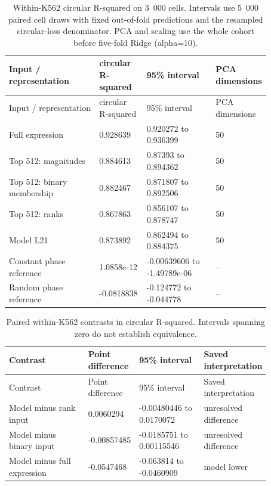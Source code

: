 \begin{longtable}{@{}L{0.34\linewidth}L{0.15\linewidth}L{0.26\linewidth}L{0.12\linewidth}@{}}
\caption{Within-K562 circular R-squared on 3~000 cells. Intervals use 5~000 paired cell draws with fixed out-of-fold predictions and the resampled circular-loss denominator. PCA and scaling use the whole cohort before five-fold Ridge (alpha=10).}\\
\toprule
Input / representation & circular R-squared & 95\% interval & PCA dimensions \\
\midrule
\endfirsthead
\toprule
Input / representation & circular R-squared & 95\% interval & PCA dimensions \\
\midrule
\endhead
\endfoot
\bottomrule
\endlastfoot
Full expression & 0.928639 & 0.920272 to 0.936399 & 50 \\
Top 512: magnitudes & 0.884613 & 0.87393 to 0.894362 & 50 \\
Top 512: binary membership & 0.882467 & 0.871807 to 0.892506 & 50 \\
Top 512: ranks & 0.867863 & 0.856107 to 0.878747 & 50 \\
Model L21 & 0.873892 & 0.862494 to 0.884375 & 50 \\
Constant phase reference & \mbox{1.0858e-12} & -0.00639606 to \mbox{-1.49789e-06} & -- \\
Random phase reference & -0.0818838 & -0.124772 to -0.044778 & -- \\
\end{longtable}
\begin{longtable}{@{}L{0.31\linewidth}L{0.15\linewidth}L{0.25\linewidth}L{0.16\linewidth}@{}}
\caption{Paired within-K562 contrasts in circular R-squared. Intervals spanning zero do not establish equivalence.}\\
\toprule
Contrast & Point difference & 95\% interval & Saved interpretation \\
\midrule
\endfirsthead
\toprule
Contrast & Point difference & 95\% interval & Saved interpretation \\
\midrule
\endhead
\endfoot
\bottomrule
\endlastfoot
Model minus rank input & 0.0060294 & -0.00480446 to 0.0170072 & unresolved difference \\
Model minus binary input & -0.00857485 & -0.0185751 to 0.00115546 & unresolved difference \\
Model minus full expression & -0.0547468 & -0.063814 to -0.0460909 & model lower \\
\end{longtable}
